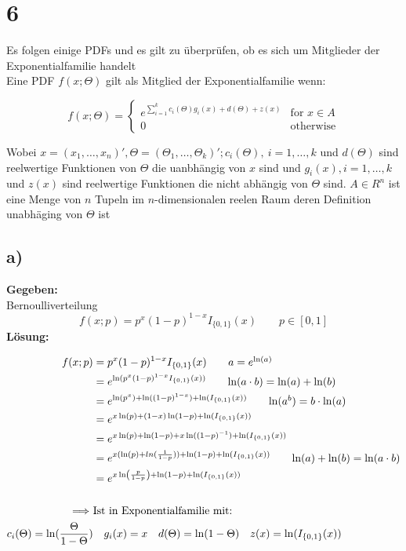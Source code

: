 \documentclass{article}
\begin{document}
\section*{6}
Es folgen einige PDFs und es gilt zu überprüfen, ob es sich um Mitglieder der Exponentialfamilie handelt \\

Eine PDF $f(x;\Theta)$ gilt als Mitglied der Exponentialfamilie wenn:

\[f(x; \Theta) = \begin{cases}
    e^{\sum_{i=1}^{k} c_i(\Theta)g_i(x) + d(\Theta) + z(x)} & \text{for }x\in A\\
    0 &\text{otherwise}
\end{cases}\]

Wobei $x = (x_1, \ldots, x_n)', \Theta = (\Theta_1, \ldots, \Theta_k)'; c_i(\Theta), ~ i = 1, \ldots, k $ und $d(\Theta)$ sind reelwertige Funktionen von $\Theta$ die uanbhängig von $x$  sind  und $g_i(x), i=1, \ldots, k$ und $z(x)$ sind reelwertige Funktionen die nicht abhängig von $\Theta$ sind. $A \in R^n$ ist eine Menge von $n$ Tupeln im $n$-dimensionalen reelen Raum deren Definition unabhäging von $\Theta$ ist  

\subsection*{a)}
\textbf{Gegeben:}\\

Bernoulliverteilung
\[f(x;p) = p^{x}(1-p)^{1-x}I_{\{0,1\}}(x) \qquad p\in[0,1]\]
\textbf{Lösung:}

\begin{align*}
    f(x;p) &= p^{x}(1-p)^{1-x}I_{\{0,1\}}(x) \tag*{$a = e^{\ln(a)}$}\\
    &= e^{\ln(p^{x}(1-p)^{1-x}I_{\{0,1\}}(x))} \tag*{$\ln(a \cdot b) = \ln(a) + \ln(b)$}\\
    &= e^{\ln(p^x) + \ln((1-p)^{1-x}) + \ln(I_{\{0,1\}}(x))} \tag*{$\ln(a^b) = b \cdot \ln(a)$} \\
    &= e^{x\ln(p) + (1-x) \ln(1-p) + \ln(I_{\{0,1\}}(x))} \\
    &= e^{x\ln(p) + \ln(1-p) + x\ln((1-p)^{-1}) + \ln(I_{\{0,1\}}(x))} \\
    &= e^{x(\ln(p) + ln(\frac{1}{1-p})) + \ln(1-p) + \ln(I_{\{0,1\}}(x))} \tag*{$\ln(a)+\ln(b) = \ln(a\cdot b)$}\\
    &= e^{x \ln \left(\frac{p}{1-p}\right) + \ln(1-p) + \ln(I_{\{0,1\}}(x))} \\ \\
    \Longrightarrow ~ &\text{Ist in Exponentialfamilie mit:} \\
    c_i(\Theta) = \ln(\frac{\Theta}{1-\Theta}) &\quad g_i(x) = x \quad d(\Theta) = \ln(1-\Theta) \quad z(x) = \ln(I_{\{0,1\}}(x))
\end{align*}
\end{document}
